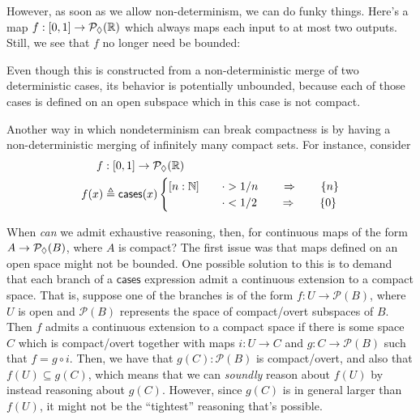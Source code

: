 However, as soon as we allow non-determinism, we can do funky things. Here's a map $f : [0,1] \to \mathcal{P}_\lozenge(\mathbb{R})$ which always maps each input to at most two outputs. Still, we see that $f$ no longer need be bounded:
\begin{center}
\end{center}

Even though this is constructed from a non-deterministic merge of two deterministic cases, its behavior is potentially unbounded, because each of those cases is defined on an open subspace which in this case is not compact.

Another way in which nondeterminism can break compactness is by having a non-deterministic merging of infinitely many compact sets. For instance, consider
\begin{align*}
f &: [0,1] \to \mathcal{P}_\lozenge(\mathbb{R})
\\ f(x) &\triangleq \mathsf{cases}(x)
\begin{cases}
[n : \mathbb{N}] \quad &\cdot > 1 / n
 \qquad \Rightarrow \qquad
 \{ n \}
\\ \quad &\cdot < 1/2
\qquad \Rightarrow \qquad
\{ 0 \}
\end{cases}
\end{align*}

When \emph{can} we admit exhaustive reasoning, then, for continuous maps of the form $A \to \mathcal{P}_\lozenge(B)$, where $A$ is compact? The first issue was that maps defined on an open space might not be bounded. One possible solution to this is to demand that each branch of a $\mathsf{cases}$ expression admit a continuous extension to a compact space. That is, suppose one of the branches is of the form $f : U \to \mathcal{P}(B)$, where $U$ is open and $\mathcal{P}(B)$ represents the space of compact/overt subspaces of $B$. Then $f$ admits a continuous extension to a compact space if there is some space $C$ which is compact/overt together with maps $i : U \to C$ and $g : C \to \mathcal{P}(B)$ such that $f = g \circ i$. Then, we have that $g(C) : \mathcal{P}(B)$ is compact/overt, and also that $f(U) \subseteq g(C)$, which means that we can \emph{soundly} reason about $f(U)$ by instead reasoning about $g(C)$. However, since $g(C)$ is in general larger than $f(U)$, it might not be the ``tightest'' reasoning that's possible.

